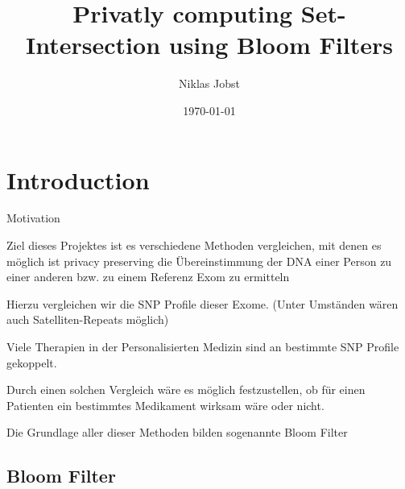 \documentclass{beamer}
\title[Privatly computing Set-Intersection]{Privatly computing Set-Intersection using Bloom Filters}
\author{Niklas Jobst}
\institute{TCS - Universität zu Lübeck}
\date{\today}
\begin{document}
	
	\begin{frame}
		\titlepage
	\end{frame}
	
	
	\section{Introduction}
	
	\begin{frame}{Motivation}
		
		\begin{arrowlist}
			\item  Ziel dieses Projektes ist es verschiedene Methoden vergleichen, mit denen es möglich ist privacy preserving die Übereinstimmung der DNA einer Person zu einer anderen bzw. zu einem Referenz Exom zu ermitteln
			\item Hierzu vergleichen wir die SNP Profile dieser Exome.	
			(Unter Umständen wären auch Satelliten-Repeats möglich)
			
		\end{arrowlist}
		
		
		
	\end{frame}
	
	\begin{frame}
		
		\begin{arrowlist}
			
			\item Viele Therapien in der Personalisierten Medizin sind an bestimmte SNP Profile gekoppelt.
			\item Durch einen solchen Vergleich wäre es möglich festzustellen, ob für einen Patienten ein bestimmtes Medikament wirksam wäre oder nicht. 
			\item Die Grundlage aller dieser Methoden bilden sogenannte Bloom Filter
		\end{arrowlist}
		
		
		
	\end{frame}
	\subsection{Bloom Filter}
	
\end{document}
